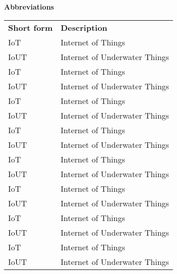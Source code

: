 
\begin{center}
{\huge \bfseries Abbreviations} \\
\end{center}
\vspace{1cm}

\begin{table}[htbp]
    \centering
    \begin{tabular}{p{3cm} p{10cm}}
        \textbf{Short form} & \textbf{Description} \\
        IoT & Internet of Things \\
        IoUT & Internet of Underwater Things \\
        IoT & Internet of Things \\
        IoUT & Internet of Underwater Things \\
        IoT & Internet of Things \\
        IoUT & Internet of Underwater Things \\
        IoT & Internet of Things \\
        IoUT & Internet of Underwater Things \\
        IoT & Internet of Things \\
        IoUT & Internet of Underwater Things \\
        IoT & Internet of Things \\
        IoUT & Internet of Underwater Things \\
        IoT & Internet of Things \\
        IoUT & Internet of Underwater Things \\
        IoT & Internet of Things \\
        IoUT & Internet of Underwater Things \\
    \end{tabular}
\end{table}

